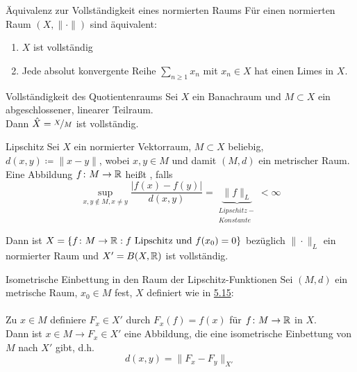	\begin{karte}{Äquivalenz zur Vollständigkeit eines normierten Raums}	
		Für einen normierten Raum $(X, \| \cdot \|)$ sind äquivalent:
		\begin{enumerate}[label=\alph*\upshape)]
			\item $X$ ist vollständig
			\item Jede absolut konvergente Reihe $\sum_{n \geq 1} x_{n}$ mit $x_{n} \in X$ hat einen Limes in $X$.
		\end{enumerate}	
	\end{karte}
	
	\begin{karte}{Vollständigkeit des Quotientenraums}
		Sei $X$ ein Banachraum und $M \subset X$ ein abgeschlossener, linearer Teilraum. \\
		Dann $\hat X = \nicefrac{X}{M}$ ist vollständig.
	\end{karte}
	
	\begin{karte}{Lipschitz}	
		Sei $X$ ein normierter Vektorraum, $M \subset X$ beliebig, $d(x, y) \coloneqq \| x - y \|$, wobei $x, y \in M$ und damit $(M, d)$ ein metrischer Raum. \\
		Eine Abbildung $f \colon M \rightarrow \mathbb{R}$ hei{\ss}t , falls
		\[ \sup_{x, y \notin M, x \neq y} \frac{|f(x) - f(y)|}{d(x, y)} = \underbrace{\| f \|_{L}}_{\begin{matrix} Lipschitz- \\ Konstante \end{matrix}} < \infty \]
		
		Dann ist $X = \{ f \colon M \rightarrow \mathbb{R} : f \text{ Lipschitz und } f(x_{0}) = 0 \}$	
	bezüglich $\| \cdot \|_{L}$ ein normierter Raum und $X' = B(X, \mathbb{R})$ ist vollständig.
	\end{karte}

	\begin{karte}{Isometrische Einbettung in den Raum der Lipschitz-Funktionen}		
		Sei $(M,d)$ ein metrische Raum, $x_{0} \in M$ fest, $X$ definiert wie in \hyperref[def:5.15-	Lipschitz]{5.15}: \\ \\
		Zu $x \in M$ definiere $F_{x} \in X'$ durch $F_{x}(f) = f(x)$ für $f \colon M \rightarrow \mathbb{R}$ in $X$. \\
		Dann ist $x \in M \rightarrow F_{x} \in X'$ eine Abbildung, die eine isometrische Einbettung von $M$ nach $X'$ gibt, d.h. 
		\[ d(x, y) = \| F_{x} - F_{y} \|_{X'} \]
	\end{karte}
	
